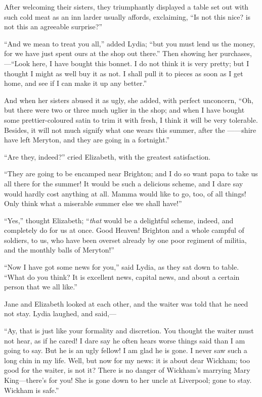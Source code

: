 After welcoming their sisters, they triumphantly displayed a table set out with such cold meat as an inn larder usually affords, exclaiming, ``Is not this nice? is not this an agreeable surprise?''

``And we mean to treat you all,'' added Lydia; ``but you must lend us the money, for we have just spent ours at the shop out there.'' Then showing her purchases,---``Look here, I have bought this bonnet. I do not think it is very pretty; but I thought I might as well buy it as not. I shall pull it to pieces as soon as I get home, and see if I can make it up any better.''

And when her sisters abused it as ugly, she added, with perfect unconcern, ``Oh, but there were two or three much uglier in the shop; and when I have bought some prettier-coloured satin to trim it with fresh, I think it will be very tolerable. Besides, it will not much signify what one wears this summer, after the ------shire have left Meryton, and they are going in a fortnight.''

``Are they, indeed?'' cried Elizabeth, with the greatest satisfaction.

``They are going to be encamped near Brighton; and I do so want papa to take us all there for the summer! It would be such a delicious scheme, and I dare say would hardly cost anything at all. Mamma would like to go, too, of all things! Only think what a miserable summer else we shall have!''

``Yes,'' thought Elizabeth; ``\textit{that} would be a delightful scheme, indeed, and completely do for us at once. Good Heaven! Brighton and a whole campful of soldiers, to us, who have been overset already by one poor regiment of militia, and the monthly balls of Meryton!''

``Now I have got some news for you,'' said Lydia, as they sat down to table. ``What do you think? It is excellent news, capital news, and about a certain person that we all like.''

Jane and Elizabeth looked at each other, and the waiter was told that he need not stay. Lydia laughed, and said,---

``Ay, that is just like your formality and discretion. You thought the waiter must not hear, as if he cared! I dare say he often hears worse things said than I am going to say. But he is an ugly fellow! I am glad he is gone. I never saw such a long chin in my life. Well, but now for my news: it is about dear Wickham; too good for the waiter, is not it? There is no danger of Wickham's marrying Mary King---there's for you! She is gone down to her uncle at Liverpool; gone to stay. Wickham is safe.''

